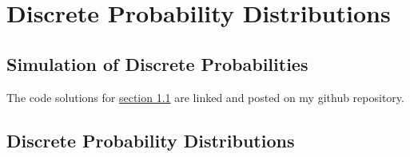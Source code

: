 \chapter{Discrete Probability Distributions}
\section{Simulation of Discrete Probabilities}

The code solutions for  \href{https://github.com/krishramkumar06/probability/tree/main/grinstead_snell_probability_solutions/ch1/1-1}{section 1.1} are linked and posted on my github repository.


\section{Discrete Probability Distributions}

